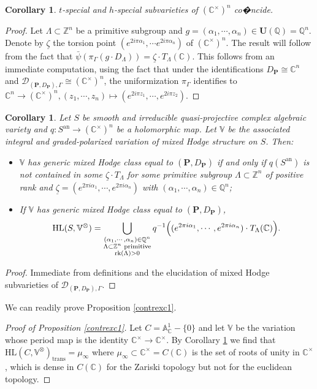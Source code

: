 \documentclass[10pt]{article}
\numberwithin{equation}{subsection}
\theoremstyle{plain}
\newtheorem{corollary}[theorem]{Corollary}
\theoremstyle{definition}
\theoremstyle{remark}
\newcommand{\Z}{\mathbb Z}
\newcommand{\Q}{\mathbb Q}
\newcommand{\C}{\mathbb C}
\newcommand{\V}{\mathbb V}
\newcommand{\pp}{\mathbf P}
\newcommand{\uu}{\mathbf U}
\newcommand{\an}{\mathrm{an}}
\newcommand{\period}{\mathscr{D}}
\newcommand{\trans}{\mathrm{trans}}
\newcommand{\zetaa}{\underline{\zeta}}
\begin{document}
\begin{corollary}
$t$-special and $h$-special subvarieties of $(\C^\times)^n$ co�ncide.
\end{corollary}
\begin{proof}
Let $\Lambda \subset \Z^n$ be a primitive subgroup and $g = (\alpha_1, \cdots, \alpha_n) \in \uu(\Q) = \Q^n$. Denote by $\zetaa$ the torsion point $(e^{2i\pi \alpha_1}, \cdots e^{2 i \pi \alpha_n})$ of $(\C^\times)^n$. The result will follow from the fact that $\bar{\psi}(\pi_\Gamma (g \cdot D_\Lambda)) = \zetaa \cdot T_\Lambda(\C)$. This follows from an immediate computation, using the fact that under the identifications $D_\pp \cong \C^n$ and $\period_{(\pp, D_\pp), \Gamma} \cong (\C^\times)^n$, the uniformization $\pi_\Gamma$ identifies to $\C^n \rightarrow (\C^\times)^n, (z_1, \cdots, z_n) \mapsto (e^{2i\pi z_1}, \cdots, e^{2i\pi z_2})$.
\end{proof}
\begin{corollary}\label{HL}
Let $S$ be smooth and irreducible quasi-projective complex algebraic variety and $q : S^\an \rightarrow (\C^\times)^n$ be a holomorphic map. Let $\V$ be the associated integral and graded-polarized variation of mixed Hodge structure on $S$. Then:
\begin{itemize}
\item[(i)] $\V$ has generic mixed Hodge class equal to $(\pp, D_\pp)$ if and only if $q(S^\an)$ is not contained in some $\zetaa \cdot T_\Lambda$ for some primitive subgroup $\Lambda \subset \Z^n$ of positive rank and $\zetaa = (e^{2\pi i \alpha_1}, \cdots, e^{2 \pi i \alpha_n})$ with $(\alpha_1, \cdots, \alpha_n) \in \Q^n$;
\item[(ii)] If $\V$ has generic mixed Hodge class equal to $(\pp, D_\pp)$, 
\[
\mathrm{HL}(S, \V^\otimes) = \bigcup_{\substack{(\alpha_1,\cdots, \alpha_n) \in \Q^n \\ \Lambda \subset  \Z^n \hspace{0.1cm} \mathrm{primitive} \\ \mathrm{rk}(\Lambda) > 0}} q^{-1}\Big((e^{2\pi i \alpha_1}, \cdots, e^{2 \pi i \alpha_n}) \cdot T_\Lambda(\C)\Big).
\]
\end{itemize}
\end{corollary}
\begin{proof}
Immediate from definitions and the elucidation of mixed Hodge subvarieties of $\period_{(\pp, D_\pp), \Gamma}$.
\end{proof}
We can readily prove Proposition \ref{contrexc1}.
\begin{proof}[Proof of Proposition \ref{contrexc1}]
Let $C = \mathbb{A}^1_\C- \{0\}$ and let $\V$ be the variation whose period map is the identity $\C^\times \rightarrow \C^\times$. By Corollary \ref{HL} we find that $\mathrm{HL}(C, \V^\otimes)_\trans = \mu_\infty$ where $\mu_\infty \subset \C^\times = C(\C)$ is the set of roots of unity in $\C^\times$, which is dense in $C(\C)$ for the Zariski topology but not for the euclidean topology.
\end{proof}
\end{document}
